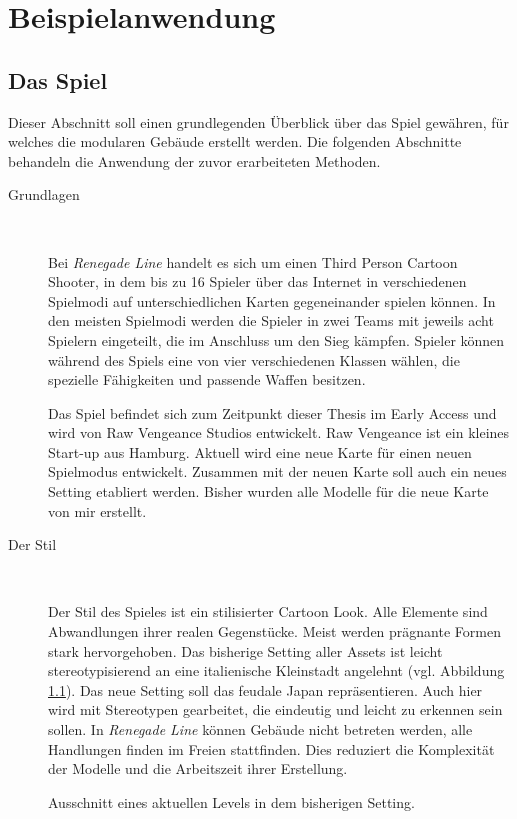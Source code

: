 \chapter{Beispielanwendung}
\section{Das Spiel}
Dieser Abschnitt soll einen grundlegenden Überblick über das Spiel gewähren, für welches die modularen Gebäude erstellt werden. Die folgenden Abschnitte behandeln die Anwendung der zuvor erarbeiteten Methoden.
\begin{description}
\item[Grundlagen]~\par
Bei \textit{Renegade Line} handelt es sich um einen Third Person Cartoon Shooter, in dem bis zu 16 Spieler über das Internet in verschiedenen Spielmodi auf unterschiedlichen Karten gegeneinander spielen können. In den meisten Spielmodi werden die Spieler in zwei Teams mit jeweils acht Spielern eingeteilt, die im Anschluss um den Sieg kämpfen. Spieler können während des Spiels eine von vier verschiedenen Klassen wählen, die spezielle Fähigkeiten und passende Waffen besitzen.
\par
Das Spiel befindet sich zum Zeitpunkt dieser Thesis im Early Access und wird von Raw Vengeance Studios entwickelt. Raw Vengeance ist ein kleines Start-up aus Hamburg. Aktuell wird eine neue Karte für einen neuen Spielmodus entwickelt. Zusammen mit der neuen Karte soll auch ein neues Setting etabliert werden. Bisher wurden alle Modelle für die neue Karte von mir erstellt.
\item[Der Stil]~\par
Der Stil des Spieles ist ein stilisierter Cartoon Look. Alle Elemente sind Abwandlungen ihrer realen Gegenstücke. Meist werden prägnante Formen stark hervorgehoben. Das bisherige Setting aller Assets ist leicht stereotypisierend an eine italienische Kleinstadt angelehnt (vgl. Abbildung \ref{altSetting}). Das neue Setting soll das feudale Japan repräsentieren. Auch hier wird mit Stereotypen gearbeitet, die eindeutig und leicht zu erkennen sein sollen. In \textit{Renegade Line} können Gebäude nicht betreten werden, alle Handlungen finden im Freien stattfinden. Dies reduziert die Komplexität der Modelle und die Arbeitszeit ihrer Erstellung.
\end{description}
\enlargethispage{12pt}
\begin{figure}[H]
\centering
  \caption{Ausschnitt eines aktuellen Levels in dem bisherigen Setting.}
	\label{altSetting}
\end{figure}

